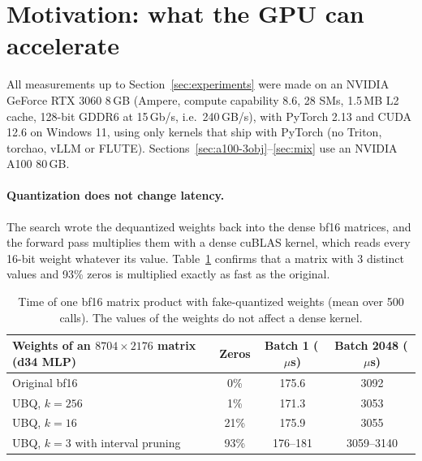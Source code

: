 \documentclass[11pt]{article}
\newcommand{\us}{\,$\mu$s}
\begin{document}
\section{Motivation: what the GPU can accelerate}
\label{sec:motivation}

All measurements up to Section~\ref{sec:experiments} were made on an NVIDIA GeForce RTX 3060 8\,GB (Ampere, compute
capability 8.6, 28 SMs, 1.5\,MB L2 cache, 128-bit GDDR6 at 15\,Gb/s, i.e.\ 240\,GB/s), with PyTorch
2.13 and CUDA 12.6 on Windows 11, using only kernels that ship with PyTorch (no Triton, torchao, vLLM or
FLUTE). Sections~\ref{sec:a100-3obj}--\ref{sec:mix} use an NVIDIA A100 80\,GB.

\paragraph{Quantization does not change latency.}
The search wrote the dequantized weights back into the dense bf16 matrices, and the forward pass
multiplies them with a dense cuBLAS kernel, which reads every 16-bit weight whatever its value.
Table~\ref{tab:fakequant} confirms that a matrix with 3 distinct values and 93\% zeros is multiplied
exactly as fast as the original.

\begin{table}[htbp]
\centering
\small
\begin{tabular}{lccc}
\toprule
Weights of an $8704\times2176$ matrix (d34 MLP) & Zeros & Batch 1 (\us) & Batch 2048 (\us) \\
\midrule
Original bf16                              & 0\%  & 175.6   & 3092 \\
UBQ, $k=256$                               & 1\%  & 171.3   & 3053 \\
UBQ, $k=16$                                & 21\% & 175.9   & 3055 \\
UBQ, $k=3$ with interval pruning           & 93\% & 176--181 & 3059--3140 \\
\bottomrule
\end{tabular}
\caption{Time of one bf16 matrix product with fake-quantized weights (mean over 500 calls). The values
of the weights do not affect a dense kernel.}
\label{tab:fakequant}
\end{table}
\end{document}
